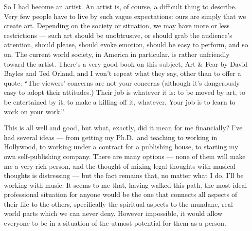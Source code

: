 So I had become an artist. An artist is, of course, a difficult thing to describe. Very few people have to live by such vague expectations: ours are simply that we create art. Depending on the society or situation, we may have more or less restrictions --- such art should be unobtrusive, or should grab the audience's attention, should please, should evoke emotion, should be easy to perform, and so on. The current world society, in America in particular, is rather unfriendly toward the artist. There's a very good book on this subject, Art \& Fear by David Bayles and Ted Orland, and I won't repeat what they say, other than to offer a quote: ``The viewers' concerns are not your concerns (although it's dangerously easy to adopt their attitudes.) Their job is whatever it is: to be moved by art, to be entertained by it, to make a killing off it, whatever. Your job is to learn to work on your work.''

This is all well and good, but what, exactly, did it mean for me financially? I've had several ideas --- from getting my Ph.D.~and teaching to working in Hollywood, to working under a contract for a publishing house, to starting my own self-publishing company. There are many options --- none of them will make me a very rich person, and the thought of mixing legal thoughts with musical thoughts is distressing --- but the fact remains that, no matter what I do, I'll be working with music. It seems to me that, having walked this path, the most ideal professional situation for anyone would be the one that connects all aspects of their life to the others, specifically the spiritual aspects to the mundane, real world parts which we can never deny. However impossible, it would allow everyone to be in a situation of the utmost potential for them as a person.
